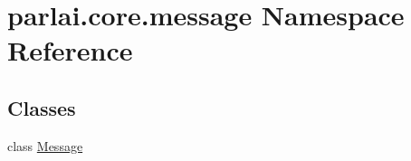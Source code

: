 \hypertarget{namespaceparlai_1_1core_1_1message}{}\section{parlai.\+core.\+message Namespace Reference}
\label{namespaceparlai_1_1core_1_1message}
\subsection*{Classes}
\begin{DoxyCompactItemize}
\item 
class \hyperlink{classparlai_1_1core_1_1message_1_1Message}{Message}
\end{DoxyCompactItemize}
